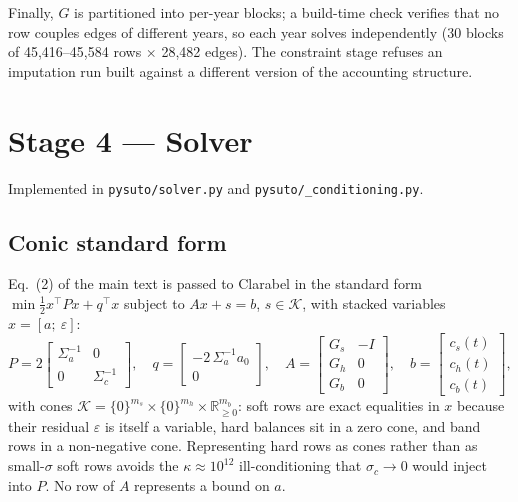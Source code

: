\documentclass[11pt]{article}
\begin{document}
Finally, $G$ is partitioned into per-year blocks; a build-time check
verifies that no row couples edges of different years, so each year solves
independently (30 blocks of 45{,}416--45{,}584 rows $\times$ 28{,}482
edges). The constraint stage refuses an imputation run built against a
different version of the accounting structure.

\section{Stage 4 --- Solver}\label{si:stage4}
Implemented in \texttt{pysuto/solver.py} and \texttt{pysuto/\_conditioning.py}.

\subsection{Conic standard form}
Eq.~(2) of the main text is passed to Clarabel \citep{goulart2024clarabel} in
the standard form $\min \tfrac12 x^\top P x + q^\top x$ subject to
$Ax + s = b$, $s \in \mathcal{K}$, with stacked variables
$x = [a;\ \varepsilon]$:
\begin{equation}
P = 2\begin{bmatrix}\Sigma_a^{-1} & 0\\ 0 & \Sigma_c^{-1}\end{bmatrix},
\quad
q = \begin{bmatrix}-2\,\Sigma_a^{-1} a_0\\ 0\end{bmatrix},
\quad
A = \begin{bmatrix}G_s & -I\\ G_h & 0\\ G_b & 0\end{bmatrix},
\quad
b = \begin{bmatrix}c_s(t)\\ c_h(t)\\ c_b(t)\end{bmatrix},
\end{equation}
with cones $\mathcal{K} = \{0\}^{m_s} \times \{0\}^{m_h} \times
\mathbb{R}_{\ge 0}^{m_b}$: soft rows are exact equalities in $x$ because their
residual $\varepsilon$ is itself a variable, hard balances sit in a zero cone,
and band rows in a non-negative cone. Representing hard rows as cones rather
than as small-$\sigma$ soft rows avoids the $\kappa \approx 10^{12}$
ill-conditioning that $\sigma_c \to 0$ would inject into $P$. No row of $A$
represents a bound on $a$.
\end{document}

